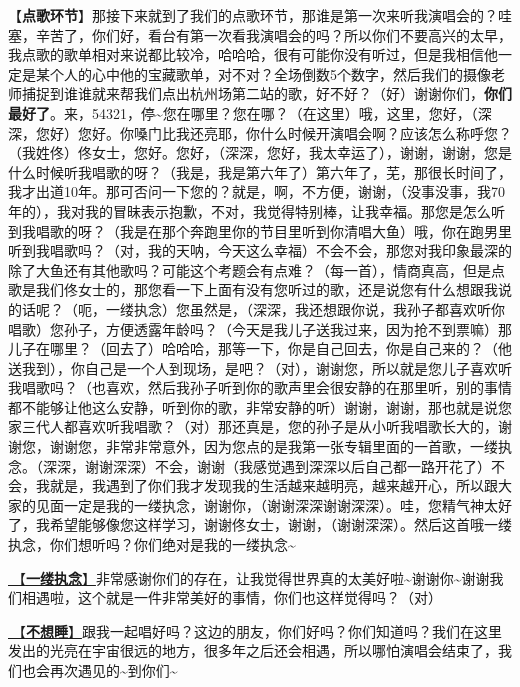 \documentclass[]{ctexbook}
\begin{document}
【\textbf{点歌环节}】那接下来就到了我们的点歌环节，那谁是第一次来听我演唱会的？哇塞，辛苦了，你们好，看台有第一次看我演唱会的吗？所以你们不要高兴的太早，我点歌的歌单相对来说都比较冷，哈哈哈，很有可能你没有听过，但是我相信他一定是某个人的心中他的宝藏歌单，对不对？全场倒数5个数字，然后我们的摄像老师捕捉到谁谁就来帮我们点出杭州场第二站的歌，好不好？（好）谢谢你们，\textbf{你们最好了}。来，54321，停\textasciitilde 您在哪里？您在哪？（在这里）哦，这里，您好，（深深，您好）您好。你嗓门比我还亮耶，你什么时候开演唱会啊？应该怎么称呼您？（我姓佟）佟女士，您好。您好，（深深，您好，我太幸运了），谢谢，谢谢，您是什么时候听我唱歌的呀？（我是，我是第六年了）第六年了，芜，那很长时间了，我才出道10年。那可否问一下您的？就是，啊，不方便，谢谢，（没事没事，我70年的），我对我的冒昧表示抱歉，不对，我觉得特别棒，让我幸福。那您是怎么听到我唱歌的呀？（我是在那个奔跑里你的节目里听到你清唱大鱼）哦，你在跑男里听到我唱歌吗？（对，我的天呐，今天这么幸福）不会不会，那您对我印象最深的除了大鱼还有其他歌吗？可能这个考题会有点难？（每一首），情商真高，但是点歌是我们佟女士的，那您看一下上面有没有您听过的歌，还是说您有什么想跟我说的话呢？（呃，一缕执念）您虽然是，（深深，我还想跟你说，我孙子都喜欢听你唱歌）您孙子，方便透露年龄吗？（今天是我儿子送我过来，因为抢不到票嘛）那儿子在哪里？（回去了）哈哈哈，那等一下，你是自己回去，你是自己来的？（他送我到），你自己是一个人到现场，是吧？（对），谢谢您，所以就是您儿子喜欢听我唱歌吗？（也喜欢，然后我孙子听到你的歌声里会很安静的在那里听，别的事情都不能够让他这么安静，听到你的歌，非常安静的听）谢谢，谢谢，那也就是说您家三代人都喜欢听我唱歌？（对）那还真是，您的孙子是从小听我唱歌长大的，谢谢您，谢谢您，非常非常意外，因为您点的是我第一张专辑里面的一首歌，一缕执念。（深深，谢谢深深）不会，谢谢（我感觉遇到深深以后自己都一路开花了）不会，我就是，我遇到了你们我才发现我的生活越来越明亮，越来越开心，所以跟大家的见面一定是我的一缕执念，谢谢你，（谢谢深深谢谢深深）。哇，您精气神太好了，我希望能够像您这样学习，谢谢佟女士，谢谢，（谢谢深深）。然后这首哦一缕执念，你们想听吗？你们绝对是我的一缕执念\textasciitilde{}

\hyperref[a-wisp-of-obsession]{🎵【\textbf{一缕执念}】}非常感谢你们的存在，让我觉得世界真的太美好啦\textasciitilde 谢谢你\textasciitilde 谢谢我们相遇啦，这个就是一件非常美好的事情，你们也这样觉得吗？（对）

\hyperref[donot-want-to-sleep]{🎵【\textbf{不想睡}】}跟我一起唱好吗？这边的朋友，你们好吗？你们知道吗？我们在这里发出的光亮在宇宙很远的地方，很多年之后还会相遇，所以哪怕演唱会结束了，我们也会再次遇见的\textasciitilde 到你们\textasciitilde{}
\end{document}
